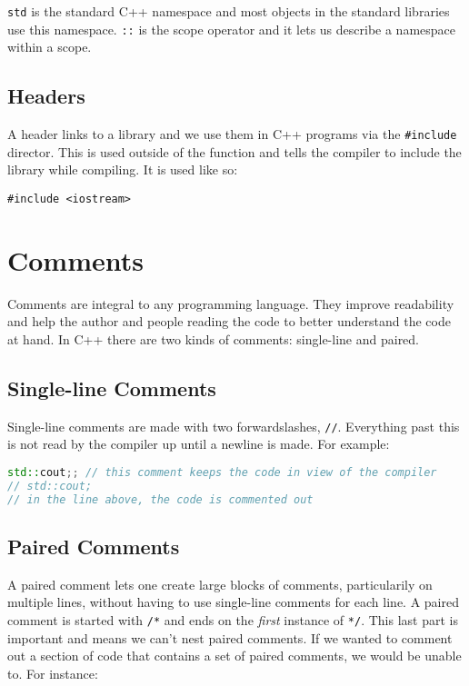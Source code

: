 \documentclass[12pt, a4paper]{report}
\begin{document}
\verb|std| is the standard C++ namespace and most objects in the standard libraries use this namespace. \verb|::| is the scope operator and it lets us describe a namespace within a scope.

\subsection{Headers}
A header links to a library and we use them in C++ programs via the \verb|#include| director. This is used outside of the function and tells the compiler to include the library while compiling. It is used like so:

\begin{center}
  \verb|#include <iostream>|
\end{center}
\section{Comments}
Comments are integral to any programming language. They improve readability and help the author and people reading the code to better understand the code at hand.
In C++ there are two kinds of comments: single-line and paired.
\subsection{Single-line Comments}
Single-line comments are made with two forwardslashes, \verb|//|. Everything past this is not read by the compiler up until a newline is made. For example:

\begin{scriptsize}
  \begin{lstlisting}[language=C++]
std::cout;; // this comment keeps the code in view of the compiler
// std::cout;
// in the line above, the code is commented out
  \end{lstlisting}
\end{scriptsize}

\subsection{Paired Comments}
A paired comment lets one create large blocks of comments, particularily on multiple lines, without having to use single-line comments for each line.
A paired comment is started with \verb|/*| and ends on the \emph{first} instance of \verb|*/|. This last part is important and means we can't nest paired comments.
If we wanted to comment out a section of code that contains a set of paired comments, we would be unable to. For instance:
\end{document}
